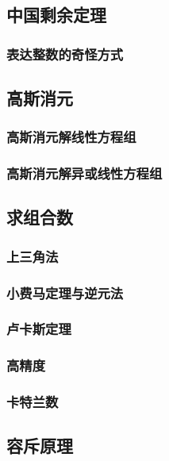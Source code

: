 \documentclass[10pt,a4paper]{article}
\begin{document}
\subsection{中国剩余定理}
\subsubsection{表达整数的奇怪方式}

\subsection{高斯消元}
\subsubsection{高斯消元解线性方程组}

\subsubsection{高斯消元解异或线性方程组}

\subsection{求组合数}
\subsubsection{上三角法}

\subsubsection{小费马定理与逆元法}

\subsubsection{卢卡斯定理}

\subsubsection{高精度}

\subsubsection{卡特兰数}

\subsection{容斥原理}
\end{document}
